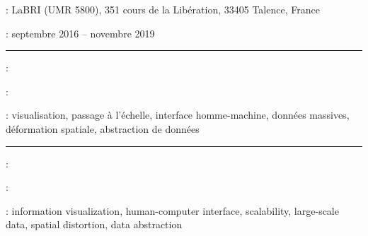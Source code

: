

\noindent{}:
LaBRI (UMR 5800), 351 cours de la Libération, 33405 Talence, France

\smallskip
\noindent{}: septembre 2016 -- novembre 2019
\begin{center}
\noindent\rule{.5\textwidth}{0.7pt}
\end{center}
\smallskip
\noindent{} : \myTitle
\smallskip

\noindent{}:
\lipsum[2-4]

\smallskip
\noindent{}: visualisation, passage à l'échelle, interface homme-machine, données massives, déformation spatiale, abstraction de données


\begin{center}
\noindent\rule{.5\textwidth}{0.6pt}
\end{center}


\noindent{} : \EnglishTitle
\smallskip

\noindent{}:
\lipsum[2-4]

\smallskip
\noindent{}: information visualization, human-computer interface, scalability, large-scale data, spatial distortion, data abstraction


